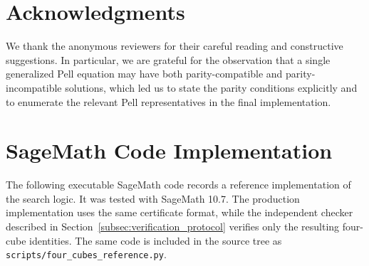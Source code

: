\documentclass{mcom-l}
\theoremstyle{definition}
\theoremstyle{remark}
\numberwithin{equation}{section}
\begin{document}
\section*{Acknowledgments}

We thank the anonymous reviewers for their careful reading and constructive
suggestions.  In particular, we are grateful for the observation that a single
generalized Pell equation may have both parity-compatible and
parity-incompatible solutions, which led us to state the parity conditions
explicitly and to enumerate the relevant Pell representatives in the final
implementation.




\appendix
\section{SageMath Code Implementation}
\label{app:code}

The following executable SageMath code records a reference implementation of
the search logic.  It was tested with SageMath 10.7.  The production
implementation uses the same certificate format, while the independent checker
described in Section~\ref{subsec:verification_protocol} verifies only the resulting
four-cube identities.  The same code is included in the source tree as
\texttt{scripts/four\_cubes\_reference.py}.
\end{document}
